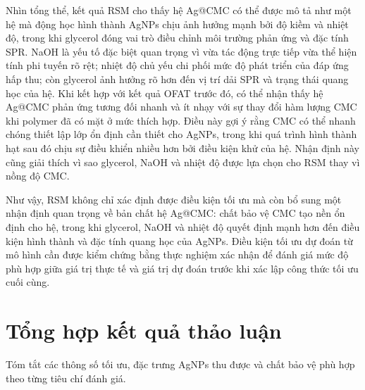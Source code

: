 Nhìn tổng thể, kết quả RSM cho thấy hệ Ag@CMC có thể được mô tả như một hệ mà động học hình thành AgNPs chịu ảnh hưởng mạnh bởi độ kiềm và nhiệt độ, trong khi glycerol đóng vai trò điều chỉnh môi trường phản ứng và đặc tính SPR. 
NaOH là yếu tố đặc biệt quan trọng vì vừa tác động trực tiếp vừa thể hiện tính phi tuyến rõ rệt; nhiệt độ chủ yếu chi phối mức độ phát triển của đáp ứng hấp thu; còn glycerol ảnh hưởng rõ hơn đến vị trí dải SPR và trạng thái quang học của hệ.
Khi kết hợp với kết quả OFAT trước đó, có thể nhận thấy hệ Ag@CMC phản ứng tương đối nhanh và ít nhạy với sự thay đổi hàm lượng CMC khi polymer đã có mặt ở mức thích hợp. 
Điều này gợi ý rằng CMC có thể nhanh chóng thiết lập lớp ổn định cần thiết cho AgNPs, trong khi quá trình hình thành hạt sau đó chịu sự điều khiển nhiều hơn bởi điều kiện khử của hệ. 
Nhận định này cũng giải thích vì sao glycerol, NaOH và nhiệt độ được lựa chọn cho RSM thay vì nồng độ CMC.

Như vậy, RSM không chỉ xác định được điều kiện tối ưu mà còn bổ sung một nhận định quan trọng về bản chất hệ Ag@CMC: chất bảo vệ CMC tạo nền ổn định cho hệ, trong khi glycerol, NaOH và nhiệt độ quyết định mạnh hơn đến điều kiện hình thành và đặc tính quang học của AgNPs. 
Điều kiện tối ưu dự đoán từ mô hình cần được kiểm chứng bằng thực nghiệm xác nhận để đánh giá mức độ phù hợp giữa giá trị thực tế và giá trị dự đoán trước khi xác lập công thức tối ưu cuối cùng.


\section{Tổng hợp kết quả thảo luận}
Tóm tắt các thông số tối ưu, đặc trưng AgNPs thu được và chất bảo vệ phù hợp theo từng tiêu chí đánh giá.
